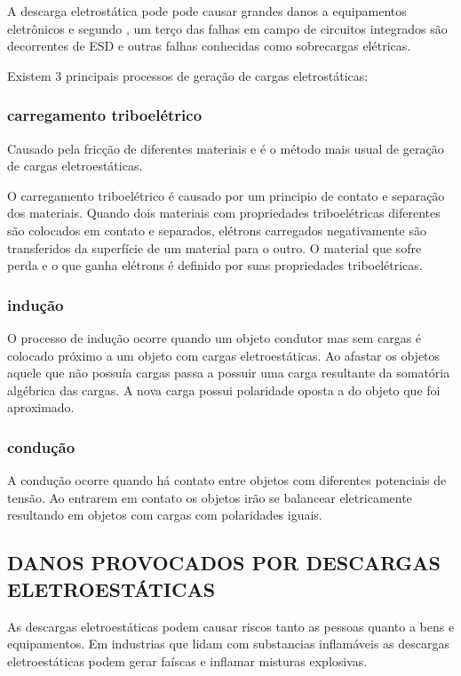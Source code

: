 \documentclass[
	12pt,				%
	openright,			%
	oneside,			%
	a4paper,			%
	chapter=TITLE,		%
	english,			%
	french,				%
	spanish,			%
	brazil,				%
	article,			%
	]{uea-abntex2}
\begin{document}
A descarga eletrostática pode pode causar grandes danos a equipamentos eletrônicos \cite{Katsivelis2010} e segundo \citeauthor{Hwang2005}, um terço das falhas em campo de circuitos integrados são decorrentes de ESD e outras falhas conhecidas como sobrecargas elétricas.

Existem 3 principais processos de geração de cargas eletrostáticas:
\subsubsection{carregamento triboelétrico}
Causado pela fricção de diferentes materiais e é o método mais usual de geração de cargas eletroestáticas.

O carregamento triboelétrico é causado por um principio de contato e separação dos materiais. Quando dois materiais com propriedades triboelétricas diferentes são colocados em contato e separados, elétrons carregados negativamente são transferidos da superfície de um material para o outro. O material que sofre perda e o que ganha elétrons é definido por suas propriedades triboelétricas\cite{Hwang2005}. 

\subsubsection{indução}
O processo de indução ocorre quando um objeto condutor mas sem cargas é colocado próximo a um objeto com cargas eletroestáticas. Ao afastar os objetos aquele que não possuía cargas passa a possuir uma carga resultante da somatória algébrica das cargas. A nova carga possui polaridade oposta a do objeto que foi aproximado.
\subsubsection{condução} 
A condução ocorre quando há contato entre objetos com diferentes potenciais de tensão. Ao entrarem em contato os objetos irão se balancear eletricamente resultando em objetos com cargas com polaridades iguais.

\subsection{DANOS PROVOCADOS POR DESCARGAS ELETROESTÁTICAS}
As descargas eletroestáticas podem causar riscos tanto as pessoas quanto a bens e equipamentos.
Em industrias que lidam com substancias inflamáveis as descargas eletroestáticas podem gerar faíscas e inflamar misturas explosivas. \cite{kassebaum}
\end{document}
